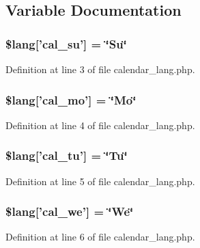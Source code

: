 \subsection{Variable Documentation}
\subsubsection[{\$lang}]{\setlength{\rightskip}{0pt plus 5cm}\$lang['cal\-\_\-su'] = \char`\"{}Su\char`\"{}}\label{calendar__lang_8php_a120ec4cf98cb46665da894790bf9d68b}


Definition at line 3 of file calendar\-\_\-lang.\-php.

\subsubsection[{\$lang}]{\setlength{\rightskip}{0pt plus 5cm}\$lang['cal\-\_\-mo'] = \char`\"{}Mo\char`\"{}}\label{calendar__lang_8php_addb07b314f8ffca137dd372ffccc0086}


Definition at line 4 of file calendar\-\_\-lang.\-php.

\subsubsection[{\$lang}]{\setlength{\rightskip}{0pt plus 5cm}\$lang['cal\-\_\-tu'] = \char`\"{}Tu\char`\"{}}\label{calendar__lang_8php_ae6d1a5da4eaa6f0ea7b90c1f1f8c5d58}


Definition at line 5 of file calendar\-\_\-lang.\-php.

\subsubsection[{\$lang}]{\setlength{\rightskip}{0pt plus 5cm}\$lang['cal\-\_\-we'] = \char`\"{}We\char`\"{}}\label{calendar__lang_8php_acfa4ce5b6c72a960be91a2ebd7049e51}


Definition at line 6 of file calendar\-\_\-lang.\-php.

